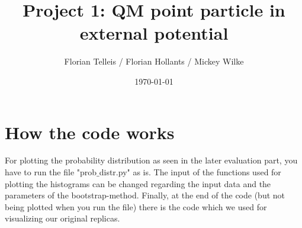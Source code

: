 \documentclass[11pt, letterpaper, onecolumn]{article}
\title{Project 1: QM point particle in external potential}
\author{Florian Telleis / Florian Hollants / Mickey Wilke}
\date{\today}
\begin{document}
	
	
	\tableofcontents
	
	
	
	\vspace{1cm}
	
	\section{How the code works}
	For plotting the probability distribution as seen in the later evaluation part, you have to run the file "prob$\_$distr.py" as is. The input of the functions used for plotting the histograms can be changed regarding the input data and the parameters of the bootstrap-method. Finally, at the end of the code (but not being plotted when you run the file) there is the code which we used for visualizing our original replicas.

	
	
\end{document}
